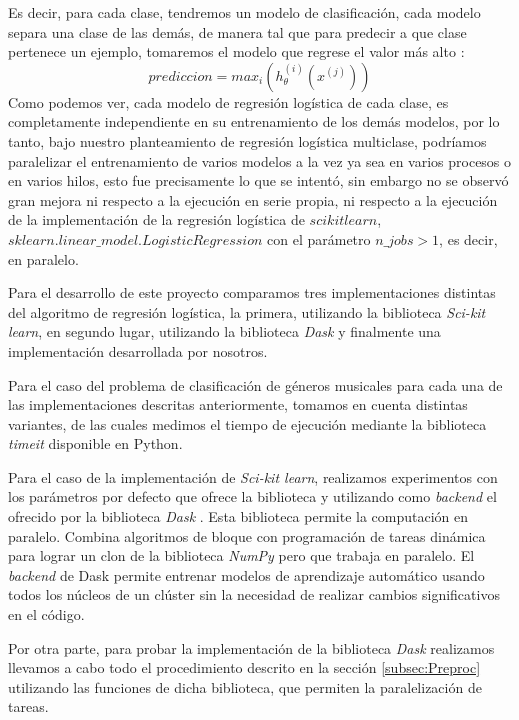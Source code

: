 \documentclass[runningheads]{llncs}
\begin{document}
Es decir, para cada clase, tendremos un modelo de clasificación, cada modelo separa una clase de las demás, de manera tal que para predecir a que clase pertenece un ejemplo, tomaremos el modelo que regrese el valor más alto \cite{MLCoursera}:
\begin{equation}
    prediccion = max_i(h_{\theta}^{(i)}(x^{(j)}))
\end{equation}
Como podemos ver, cada modelo de regresión logística de cada clase, es completamente independiente en su entrenamiento de los demás modelos, por lo tanto, bajo nuestro planteamiento de regresión logística multiclase, podríamos paralelizar el entrenamiento de varios modelos a la vez ya sea en varios procesos o en varios hilos, esto fue precisamente lo que se intentó, sin embargo no se observó gran mejora ni respecto a la ejecución en serie propia, ni respecto a la ejecución de la implementación de la regresión logística de $scikitlearn$, $sklearn.linear\_model.LogisticRegression$ con el parámetro $n\_jobs > 1$, es decir, en paralelo.


Para el desarrollo de este proyecto comparamos tres implementaciones distintas del algoritmo de regresión logística, la primera, utilizando la biblioteca \textit{Sci-kit learn}, en segundo lugar, utilizando la biblioteca \textit{Dask} y finalmente una implementación desarrollada por nosotros.

Para el caso del problema de clasificación de géneros musicales para cada una de las implementaciones descritas anteriormente, tomamos en cuenta distintas variantes, de las cuales medimos el tiempo de ejecución mediante la biblioteca \textit{timeit} disponible en Python.

Para el caso de la implementación de \textit{Sci-kit learn}, realizamos experimentos con los parámetros por defecto que ofrece la biblioteca y utilizando como \textit{backend} el ofrecido por la biblioteca \textit{Dask} \cite{dask}. Esta biblioteca permite la computación en paralelo. Combina algoritmos de bloque con programación de tareas dinámica para lograr un clon de la biblioteca \textit{NumPy} \cite{harris2020array} pero que trabaja en paralelo. El \textit{backend} de Dask permite entrenar modelos de aprendizaje automático usando todos los núcleos de un clúster sin la necesidad de realizar cambios significativos en el código.

Por otra parte, para probar la implementación de la biblioteca \textit{Dask} realizamos llevamos a cabo todo el procedimiento descrito en la sección \ref{subsec:Preproc} utilizando las funciones de dicha biblioteca, que permiten la paralelización de tareas.
\end{document}
